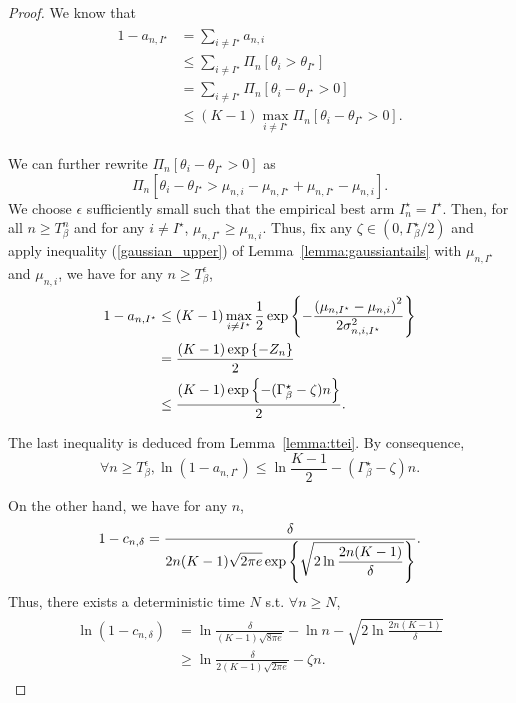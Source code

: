 \begin{proof}
    We know that
    \begin{align*}
    \begin{split}
        1 - a_{n,I^\star} &= \sum_{i\neq I^\star} a_{n,i} \\
        &\leq \sum_{i\neq I^\star} \Pi_n\left[\theta_i > \theta_{I^\star}\right] \\
        &= \sum_{i\neq I^\star} \Pi_n\left[\theta_i - \theta_{I^\star} > 0 \right] \\
        &\leq (K-1)\max_{i\neq I^\star} \Pi_n\left[\theta_i - \theta_{I^\star} > 0 \right].
    \end{split}
    \end{align*}
    
    We can further rewrite $\Pi_n\left[\theta_i - \theta_{I^\star} > 0 \right]$ as
    \[
        \Pi_n\left[\theta_i - \theta_{I^\star} > \mu_{n,i} - \mu_{n,I^\star} + \mu_{n,I^\star} - \mu_{n,i} \right].
    \]
    We choose $\epsilon$ sufficiently small such that the empirical best arm $I_n^\star = I^\star$. Then, for all $n \geq T_{\beta}^n$ and for any $i\neq I^\star$, $\mu_{n,I^\star} \geq \mu_{n,i}$. Thus, fix any $\zeta\in (0,\Gamma_{\beta}^\star/2)$ and apply inequality (\ref{gaussian_upper}) of Lemma~\ref{lemma:gaussiantails} with $\mu_{n,I^\star}$ and $\mu_{n,i}$, we have for any $n \geq T_{\beta}^\epsilon$,
    \begin{align*}
    \begin{split}
        1 - a_{n,I^\star} &\leq (K-1)\max_{i\neq I^\star}\frac{1}{2} \exp\left\{-\frac{\left(\mu_{n,I^\star}-\mu_{n,i} \right)^2}{2\sigma_{n,i,I^\star}^2}\right\} \\
        &= \frac{(K-1)\exp\left\{-Z_n\right\}}{2} \\
        &\leq \frac{(K-1)\exp\left\{-(\Gamma_{\beta}^\star-\zeta)n\right\}}{2}.
    \end{split}
    \end{align*}
    
    The last inequality is deduced from Lemma~\ref{lemma:ttei}. By consequence,
    \[
        \forall n \geq T_{\beta}^\epsilon, \ln\left(1 - a_{n,I^\star}\right) \leq \ln{\frac{K-1}{2}} - (\Gamma_{\beta}^\star-\zeta)n.
    \]
    
    On the other hand, we have for any $n$,
    \[
        1 - c_{n,\delta} = \frac{\displaystyle \delta}{\displaystyle 2n(K-1)\sqrt{2\pi e}\exp\left\{\sqrt{2\ln{\frac{2n(K-1)}{\delta}}}\right\}}.
    \]
    Thus, there exists a deterministic time $N$ s.t. $\forall n\geq N$,
    \begin{align*}
    \begin{split}
        \ln\left(1 - c_{n,\delta}\right) &= \ln{\frac{\delta}{(K-1)\sqrt{8\pi e}}} - \ln{n} - \sqrt{2\ln{\frac{2n(K-1)}{\delta}}} \\
        &\geq \ln{\frac{\delta}{2(K-1)\sqrt{2\pi e}}} - \zeta n.
    \end{split}
    \end{align*}
    

\end{proof}
